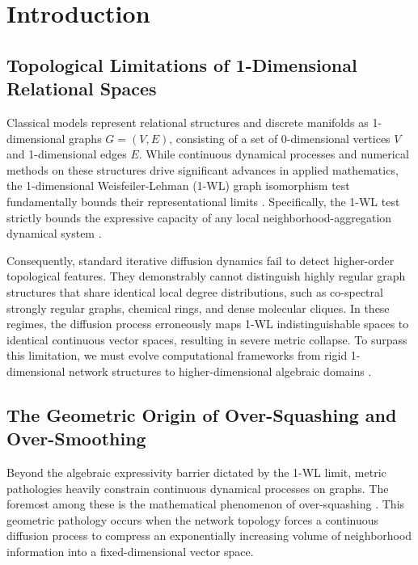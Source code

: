 \documentclass[11pt, letterpaper]{article}
\begin{document}
\newpage

\section{Introduction}
\subsection{Topological Limitations of 1-Dimensional Relational Spaces}
Classical models represent relational structures and discrete manifolds as 1-dimensional graphs $G=(V,E)$, consisting of a set of 0-dimensional vertices $V$ and 1-dimensional edges $E$. While continuous dynamical processes and numerical methods on these structures drive significant advances in applied mathematics, the 1-dimensional Weisfeiler-Lehman (1-WL) graph isomorphism test fundamentally bounds their representational limits \cite{wl_original}. Specifically, the 1-WL test strictly bounds the expressive capacity of any local neighborhood-aggregation dynamical system \cite{morris_wl}. 

Consequently, standard iterative diffusion dynamics fail to detect higher-order topological features. They demonstrably cannot distinguish highly regular graph structures that share identical local degree distributions, such as co-spectral strongly regular graphs, chemical rings, and dense molecular cliques. In these regimes, the diffusion process erroneously maps 1-WL indistinguishable spaces to identical continuous vector spaces, resulting in severe metric collapse. To surpass this limitation, we must evolve computational frameworks from rigid 1-dimensional network structures to higher-dimensional algebraic domains \cite{bodnar_cw}.

\subsection{The Geometric Origin of Over-Squashing and Over-Smoothing}
Beyond the algebraic expressivity barrier dictated by the 1-WL limit, metric pathologies heavily constrain continuous dynamical processes on graphs. The foremost among these is the mathematical phenomenon of over-squashing \cite{topping_oversquashing}. This geometric pathology occurs when the network topology forces a continuous diffusion process to compress an exponentially increasing volume of neighborhood information into a fixed-dimensional vector space.
\end{document}
